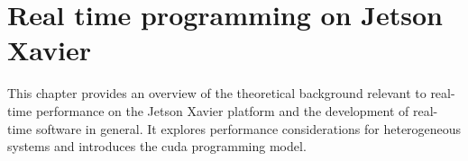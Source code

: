 \chapter{Real time programming on Jetson Xavier}
\label{chap:programming_theory}
This chapter provides an overview of the theoretical background relevant to real-time performance on the Jetson Xavier platform and the development of real-time software in general.
It explores performance considerations for heterogeneous systems and introduces the \gls{cuda} programming model.